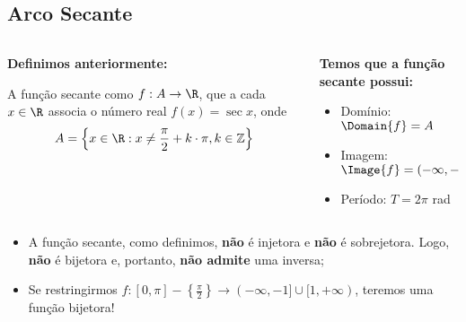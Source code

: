 \subsection{Arco Secante}
\begin{frame}
  \begin{columns}[onlytextwidth]
    \begin{column}{0.49\textwidth}\vspace{-0.5cm}
      \begin{highlight}
        \textbf{Definimos anteriormente:}

        A função secante como $f:A\rightarrow\R$, que a cada $x\in\R$ associa o número real $f(x)=\sec{x}$, onde\vspace*{-0.2cm}
        \begin{equation*}
          A=\left\{x\in\R : x\not= \frac{\pi}{2} + k\cdot\pi, k\in\mathbb{Z}\right\}\vspace*{-0.8cm}
        \end{equation*}
      \end{highlight}
    \end{column}
    \begin{column}{0.49\textwidth}\vspace*{-0.5cm}
      \begin{highlight}
        \textbf{Temos que a função secante possui:}
        \begin{itemize}
          \item Domínio: $\Domain{f} = A$
          \item Imagem: $\Image{f} = (-\infty,-1]\cup[1,+\infty)$
          \item Período: $T = 2\pi$ rad
        \end{itemize}
      \end{highlight}
    \end{column}
  \end{columns}
  \vspace*{-0.5em}
  \begin{figure}
  \end{figure}
  \vspace*{-1.75em}
  \begin{itemize}
    \item A função secante, como definimos, \textbf{não} é injetora e \textbf{não} é sobrejetora. Logo, \textbf{não} é bijetora e, portanto, \textbf{não admite} uma inversa;
    \item<2> Se restringirmos $f:[0,\pi]-\left\{\frac{\pi}{2}\right\}\rightarrow(-\infty,-1]\cup[1,+\infty)$, teremos uma função bijetora!
  \end{itemize}
\end{frame}

